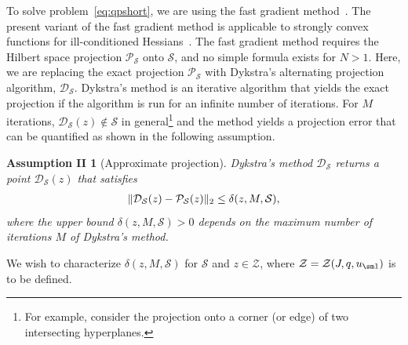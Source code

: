 \documentclass[hidelinks]{article}
\begin{document}
To solve problem~\eqref{eq:qpshort}, we are using the fast gradient method~\cite{FGMDYKSTRAARXIV}. The present variant of the fast gradient method is applicable to strongly convex functions for ill-conditioned Hessians~\cite[Ch. 2.2.4]{OPTIMNESTEROV}. The fast gradient method requires the Hilbert space projection $\mathcal{P}_{\mathcal{S}}$ onto $\mathcal{S}$, and no simple formula exists for $N>1$. Here, we are replacing the exact projection $\mathcal{P}_{\mathcal{S}}$ with Dykstra's alternating projection algorithm, $\mathcal{D}_{\mathcal{S}}$. Dykstra's method is an iterative algorithm that yields the exact projection if the algorithm is run for an infinite number of iterations. For $M$ iterations, $\mathcal{D}_\mathcal{S}(z)\not\in\mathcal{S}$ in general\footnote{For example, consider the projection onto a corner (or edge) of two intersecting hyperplanes.} and the method yields a projection error that can be quantified as shown in the following assumption.
\newtheorem*{ass3}{Assumption II}
\begin{ass3}[Approximate projection]
Dykstra's method $\mathcal{D}_{\mathcal{S}}$ returns a point $\mathcal{D}_{\mathcal{S}}(z)$ that satisfies
\begin{align}
\Vert \mathcal{D}_{\mathcal{S}}(z) - \mathcal{P}_{\mathcal{S}}(z) \Vert_2 \leq \delta (z,M,\mathcal{S}),
\end{align}
where the upper bound $\delta (z,M,\mathcal{S})>0$ depends on the maximum number of iterations $M$ of Dykstra's method.
\end{ass3}
We wish to characterize $\delta (z,M,\mathcal{S})$ for $\mathcal{S}$ and $z\in\mathcal{Z}$, where $\mathcal{Z}=\mathcal{Z}(J,q,u_{\sm 1})$ is to be defined.
\newpage
%
\end{document}
